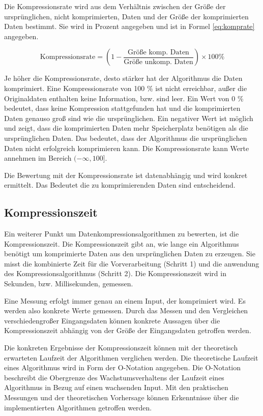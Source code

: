 \documentclass[conference]{IEEEtran}
\begin{document}
Die Kompressionsrate wird aus dem Verhältnis zwischen der Größe der ursprünglichen,
nicht komprimierten, Daten und der Größe der komprimierten Daten bestimmt.
Sie wird in Prozent angegeben und ist in Formel \ref{eq:komprate} angegeben.

\begin{equation}
  \label{eq:komprate}
  \text{Kompressionsrate} = \left(1 - \frac{\text{Größe komp. Daten}}{\text{Größe unkomp. Daten}}\right) \times 100 \%
\end{equation}

Je höher die Kompressionsrate, desto stärker hat der Algorithmus die Daten
komprimiert.
Eine Kompressionsrate von 100 \% ist nicht erreichbar, außer die Originaldaten enthalten
keine Information, bzw. sind leer.
Ein Wert von 0 \% bedeutet, dass keine Kompression stattgefunden hat und die komprimierten
Daten genauso groß sind wie die ursprünglichen.
Ein negativer Wert ist möglich und zeigt, dass die komprimierten Daten mehr Speicherplatz
benötigen als die ursprünglichen Daten.
Das bedeutet, dass der Algorithmus die ursprünglichen Daten nicht erfolgreich
komprimieren kann.
Die Kompressionsrate kann Werte annehmen im Bereich $(-\infty, 100]$.

Die Bewertung mit der Kompressionsrate ist datenabhängig und wird konkret
ermittelt.
Das Bedeutet die zu komprimierenden Daten sind entscheidend.

\subsection{Kompressionszeit}

Ein weiterer Punkt um Datenkompressionsalgorithmen zu bewerten, ist die
Kompressionszeit.
Die Kompressionszeit gibt an, wie lange ein Algorithmus benötigt um
komprimierte Daten aus den ursprünglichen Daten zu erzeugen.
Sie misst die kombinierte Zeit für die Vorverarbeitung (Schritt 1) und die
anwendung des Kompressionsalgorithmus (Schritt 2).
Die Kompressionszeit wird in Sekunden, bzw. Millisekunden, gemessen.

Eine Messung erfolgt immer genau an einem Input, der komprimiert wird.
Es werden also konkrete Werte gemessen.
Durch das Messen und den Vergleichen verschiedengroßer Eingangsdaten können konkrete
Aussagen über die Kompressionszeit abhängig von der Größe der
Eingangsdaten getroffen werden.

Die konkreten Ergebnisse der Kompressionszeit können mit der
theoretisch erwarteten Laufzeit der Algorithmen verglichen werden.
Die theoretische Laufzeit eines Algorithmus wird in Form der O-Notation
angegeben.
Die O-Notation beschreibt die Obergrenze des Wachstumsverhaltens der Laufzeit
eines Algorithmus in Bezug auf einen wachsenden Input. \cite{chivers}
Mit den praktischen Messungen und der theoretischen Vorhersage können
Erkenntnisse über die implementierten Algorithmen getroffen werden.
\end{document}
